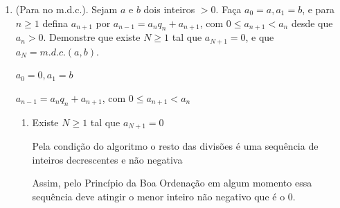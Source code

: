 \begin{enumerate}[label=3.\arabic*.]
\begin{enumerate}[label=\Roman*.]
        Substituindo no sistema temos, 

        \begin{equation*}
            \left\{
                \begin{aligned}
                    a' &= p(dk_1) + q(dk_2) = d \cdot (pk_1 + qk_2) \\
                    b' &= r(dk_1) + s(dk_2) = d \cdot (rk_1 + sk_2)
                \end{aligned}
            \right.
        \end{equation*}

        Como $d \mid a' $ e $d \mid b' $, por definição, $d | mdc(a',b') = \boxed{mdc(a,b) | mdc(a',b')}$

        \item Pelo Sistema,
        
        $L_1 \cdot s - L_2 \cdot q \Rightarrow sa' - b'q = psa + qsb - qra - qsb$

        $ sa' - b'q = a \cdot (ps - qr), \text{ logo } a = \pm (a's - b'q)$

        De forma Analoga, 
        $b = \pm (pb' - ra')$

        Assim, seja $mdc(a',b') = d'$

        Como, $d' \mid a'$ e $d' \mid b'$, então $d'$ divide qualquer combinação linear entre eles

        Logo, $d' \mid a$ e $d' \mid b$ portanto $d' \mid mdc(a,b) = \boxed{mdc(a',b') \mid mdc(a,b)}$
    \end{enumerate}    

    \item (Para no m.d.c.). Sejam $a$ e $b$ dois inteiros $>0$. Faça $a_0 = a, a_1 = b$, e para $n \geq 1$ 
    defina $a_{n+1}$ por $a_{n-1} = a_n q_n + a_{n+1}$, com $0 \leq a_{n+1} < a_n$ desde que $a_n > 0$. 
    Demonstre que existe $N \geq 1$ tal que $a_{N+1} = 0$, e que $a_N = m.d.c.(a, b)$.

    $a_0 = 0, a_1 = b$

    $a_{n-1} = a_n q_n + a_{n+1}$, com $0 \leq a_{n+1} < a_n$

    \begin{enumerate}[label=\Roman*.]
        \item Existe $N \ge 1$ tal que $a_{N+1} = 0$
        
        Pela condição do algoritmo o resto das divisões é uma sequência de inteiros 
        decrescentes e não negativa

        Assim, pelo Princípio da Boa Ordenação em algum momento essa sequência 
        deve atingir o menor inteiro não negativo que é o $0$.
        

\end{enumerate}
\end{enumerate}
